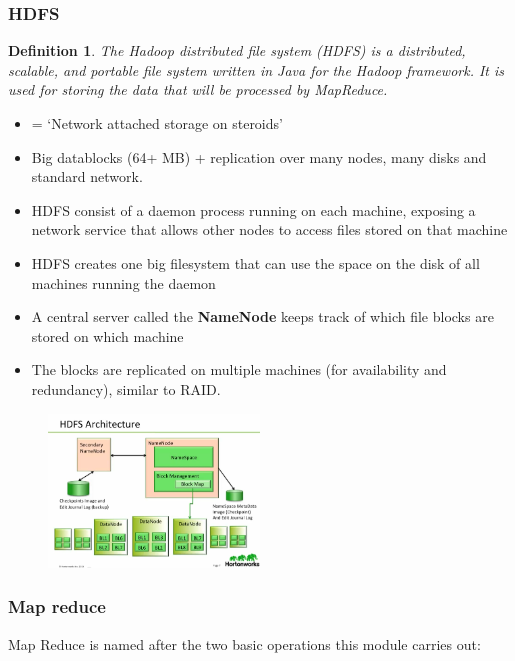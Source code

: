 \documentclass{article}
\newtheorem{theorem}{Definition}[section]
\begin{document}
\subsubsection{HDFS}

\begin{theorem}
    The Hadoop distributed file system (HDFS) is a distributed, scalable, and portable 
    file system written in Java for the Hadoop framework. It is used for storing the 
    data that will be processed by MapReduce.
\end{theorem}


\begin{itemize}
    \item = `Network attached storage on steroids'
    \item Big datablocks (64+ MB) + replication over many nodes, many disks and standard network.
    \item HDFS consist of a daemon process running on each machine, exposing a network service that allows other nodes to access files stored on that machine
    \item HDFS creates one big filesystem that can use the space on the disk of all machines running the daemon
    \item A central server called the \textbf{NameNode} keeps track of which file blocks are stored on which machine
    \item The blocks are replicated on multiple machines (for availability and redundancy), similar to RAID.
\end{itemize}

\begin{figure}[H]
    \centering
    \includegraphics[width=0.5\textwidth]{hdfs.png}
\end{figure}

\subsubsection{Map reduce}

Map Reduce is named after the two basic operations this module carries out:
\end{document}
